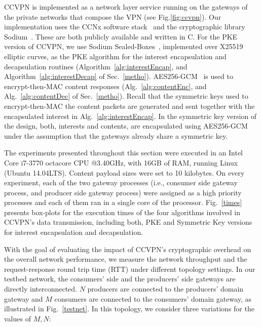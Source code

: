 CCVPN is implemented as a network layer service running on the gateways of the private networks that compose the VPN (see Fig.\ref{fig:ccvpn}).
Our implementation uses the CCNx software stack~\cite{CCNxGithub} and the cryptographic library Sodium~\cite{sodiumGithub}. These are both publicly available and written in C.
For the PKE version of CCVPN, we use Sodium Sealed-Boxes~\cite{bernstein2006curve25519}, implemented over X25519 elliptic curves, as the PKE algorithm for the interest encapsulation and decapsulation routines (Algorithm~\ref{alg:interestEncap}, and Algorithm~\ref{alg:interestDecap} of Sec.~\ref{metho}).
AES256-GCM~\cite{dworkin2007recommendation} is used to encrypt-then-MAC content responses (Alg.~\ref{alg:contentEnc}, and Alg.~\ref{alg:contentDec} of Sec.~\ref{metho}).
Recall that the symmetric keys used to encrypt-then-MAC the content packets are generated and sent together with the encapsulated interest in Alg.~\ref{alg:interestEncap}.
In the symmetric key version of the design, both, interests and contents, are encapsulated using AES256-GCM under the assumption that the gateways already share a symmetric key.


The experiments presented throughout this section were executed in an Intel Core i7-3770 octacore CPU @3.40GHz, with 16GB of RAM, running Linux (Ubuntu 14.04LTS). Content payload sizes were set to 10 kilobytes.
On every experiment, each of the two gateway processes (i.e., consumer side gateway process, and producer side gateway process) were assigned as a high priority processes and each of them ran in a single core of the processor.
Fig.~\ref{times} presents box-plots for the execution times of the four algorithms involved in CCVPN's data transmission, including both, PKE and Symmetric Key versions for interest encapsulation and decapsulation.

With the goal of evaluating the impact of CCVPN's cryptographic overhead on the overall network performance, we measure the network throughput and the request-response round trip time (RTT) under different topology settings.
In our testbed network, the consumers' side and the producers' side gateways are directly interconnected. $N$ producers are connected to the producers' domain gateway and $M$ consumers are connected to the consumers' domain gateway, as illustrated in Fig.~\ref{testnet}.
In this topology, we consider three variations for the values of ${M,N}$:

